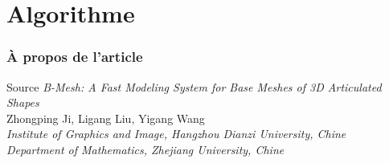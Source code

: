 \documentclass[10pt]{beamer}
\begin{document}
\section{Algorithme}

\begin{frame}
	\frametitle{À propos de l'article}
	\begin{block}{Source}
		\textit{B-Mesh: A Fast Modeling System for Base Meshes of 3D Articulated Shapes} \\
		Zhongping Ji, Ligang Liu, Yigang Wang \\
		\textit{Institute of Graphics and Image, Hangzhou Dianzi University, Chine} \\
		\textit{Department of Mathematics, Zhejiang University, Chine}
	\end{block}
\end{frame}




\end{document}
